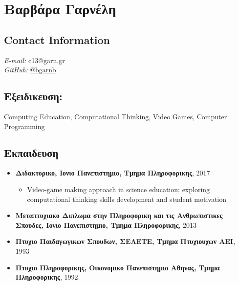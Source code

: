 \documentclass[%
    11pt,
  oneside
  ]{memoir}
\let\oldsection\section
\renewcommand{\section}[1]{%
  \oldsection{#1}
  \leavevmode
  \par
  \vspace{\dimexpr-\baselineskip-\parskip}
}
\begin{document}
      \chapter*{Βαρβάρα Γαρνέλη}
  

  \hypertarget{contact-information}{%
  \section{Contact Information}\label{contact-information}}
    \begin{minipage}[t]{0.3\textwidth}
      
    \end{minipage}
    \begin{minipage}[t]{0.7\textwidth}
                        {\textit{E-mail:}} c13@garn.gr \\
                                        {\textit{GitHub:}} \href{http://github.com/bgarnb}{@bgarnb}
            \end{minipage}
  \hypertarget{ux3b5ux3beux3b5ux3b9ux3b4ux3b9ux3baux3b5ux3c5ux3c3ux3b7}{%
\section{Εξειδικευση:}\label{ux3b5ux3beux3b5ux3b9ux3b4ux3b9ux3baux3b5ux3c5ux3c3ux3b7}}

Computing Education, Computational Thinking, Video Games, Computer
Programming

\hypertarget{ux3b5ux3baux3c0ux3b1ux3b9ux3b4ux3b5ux3c5ux3c3ux3b7}{%
\section{Εκπαιδευση}\label{ux3b5ux3baux3c0ux3b1ux3b9ux3b4ux3b5ux3c5ux3c3ux3b7}}

\begin{itemize}
\tightlist
\item
  \textbf{Διδακτορικο, Ιονιο Πανεπιστημιο, Τμημα Πληροφορικης}, 2017

  \begin{itemize}
  \tightlist
  \item
    Video-game making approach in science education: exploring
    computational thinking skills development and student motivation
  \end{itemize}
\item
  \textbf{Μεταπτυχιακο Διπλωμα στην Πληροφορικη και τις Ανθρωπιστικες
  Σπουδες, Ιονιο Πανεπιστημιο, Τμημα Πληροφορικης}, 2013
\item
  \textbf{Πτυχιο Παιδαγωγικων Σπουδων, ΣΕΛΕΤΕ, Τμημα Πτυχιουχων ΑΕΙ},
  1993
\item
  \textbf{Πτυχιο Πληροφορικης, Οικονομικο Πανεπιστημιο Αθηνας, Τμημα
  Πληροφορικης}, 1992
\end{itemize}
\end{document}

